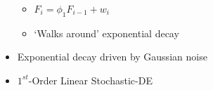 \documentclass[hyperref={pdfpagelabels=false}]{beamer}
\begin{document}
\begin{frame}
\begin{columns}
\begin{column}{0.5\textwidth}
\begin{itemize}
\begin{itemize}
        \item $F_{i} = \phi_{1} F_{i-1} + w_{i}$
        \item `Walks around' exponential decay%
      \end{itemize}
    \item Exponential decay driven by Gaussian noise
    \item $1^{st}$-Order Linear Stochastic-DE
    \end{itemize}
    \end{column}
  \end{columns}
\end{frame}


\end{document}
